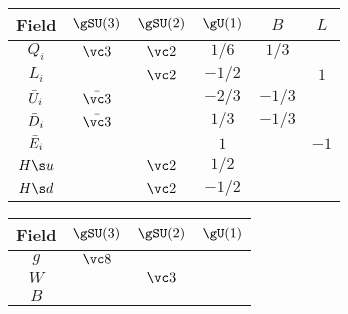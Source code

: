 \begin{center}
\begin{tabular}[t]{|c|ccc|c|c|}\hline
 Field   & $\gSU(3)$     & $\gSU(2)$ & $\gU(1)$ & $B$    & $L$  \\\hline
 $Q_i$   & $\vc 3$       & $\vc2$  & $ 1/6$ &  $1/3$ &      \\\hline
 $L_i$   &               & $\vc2$  & $-1/2$ &        &  $1$ \\\hline
 ${\bar U}_i$ & $\bar{\vc 3}$ &         & $-2/3$ & $-1/3$ &      \\\hline
 ${\bar D}_i$ & $\bar{\vc 3}$ &         & $ 1/3$ & $-1/3$ &      \\\hline
 ${\bar E}_i$ &               &         & $ 1  $ &        & $-1$ \\\hline
 $\Hu$   &               & $\vc2$  & $ 1/2$ &        &      \\\hline
 $\Hd$   &               & $\vc2$  & $-1/2$ &        &      \\\hline
\end{tabular}\hspace{2zw}
\begin{tabular}[t]{|c|ccc|}\hline
 Field   & $\gSU(3)$     & $\gSU(2)$ & $\gU(1)$ \\\hline
 $g$     & $\vc 8$       &         &        \\\hline
 $W$     &               & $\vc3$  &        \\\hline
 $B$     &               &         &        \\\hline
\end{tabular}
\end{center}

